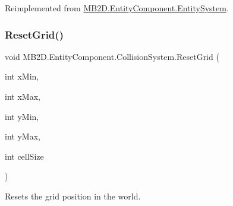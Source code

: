 Reimplemented from \hyperlink{class_m_b2_d_1_1_entity_component_1_1_entity_system_a75552787342e68c427bf2e1ffa60ed6c}{M\+B2\+D.\+Entity\+Component.\+Entity\+System}.

\hypertarget{class_m_b2_d_1_1_entity_component_1_1_collision_system_a682979b3b811fede89b625cc42b6342c}{}\label{class_m_b2_d_1_1_entity_component_1_1_collision_system_a682979b3b811fede89b625cc42b6342c} 
\subsubsection{\texorpdfstring{Reset\+Grid()}{ResetGrid()}}
{\footnotesize\ttfamily void M\+B2\+D.\+Entity\+Component.\+Collision\+System.\+Reset\+Grid (\begin{DoxyParamCaption}\item[{int}]{x\+Min,  }\item[{int}]{x\+Max,  }\item[{int}]{y\+Min,  }\item[{int}]{y\+Max,  }\item[{int}]{cell\+Size }\end{DoxyParamCaption})\hspace{0.3cm}{\ttfamily [inline]}}



Resets the grid position in the world. 


